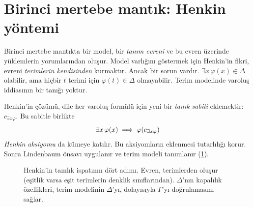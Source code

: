 \section{Birinci mertebe mantık: Henkin yöntemi}\label{sec:henkin}

Birinci mertebe mantıkta bir model, bir \emph{tanım evreni} ve bu evren
üzerinde yüklemlerin yorumlarından oluşur. Model varlığını göstermek
için Henkin'in fikri, evreni \emph{terimlerin kendisinden} kurmaktır.
Ancak bir sorun vardır. $\exists x\, \varphi(x) \in \Delta$ olabilir,
ama hiçbir $t$ terimi için $\varphi(t) \in \Delta$ olmayabilir. Terim
modelinde varoluş iddiasının bir tanığı yoktur.

Henkin'in çözümü, dile her varoluş formülü için yeni bir \emph{tanık
sabiti} eklemektir: $c_{\exists x\varphi}$. Bu sabitle birlikte
\[
  \exists x\, \varphi(x) \;\Longrightarrow\; \varphi(c_{\exists x\varphi})
\]
\emph{Henkin aksiyomu} da kümeye katılır. Bu aksiyomların eklenmesi
tutarlılığı korur. Sonra Lindenbaum önsavı uygulanır ve terim modeli
tanımlanır (\cref{fig:henkin}).

\begin{figure}[htbp]
\centering
{}
\caption{Henkin'in tamlık ispatının dört adımı. Evren, terimlerden oluşur
(eşitlik varsa eşit terimlerin denklik sınıflarından). $\Delta$'nın
kapalılık özellikleri, terim modelinin $\Delta$'yı, dolayısıyla
$\Gamma$'yı doğrulamasını sağlar.}
\label{fig:henkin}
\end{figure}


